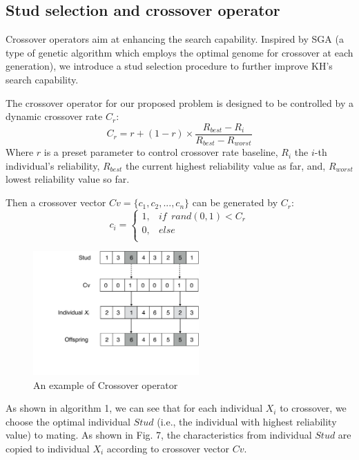 \documentclass[journal]{IEEEtran}
\begin{document}
\subsection{Stud selection and crossover operator}

Crossover operators aim at enhancing the search capability. Inspired by SGA \cite{wang2014stud} (a type of genetic algorithm which employs the optimal genome for crossover at each generation), we introduce a stud selection procedure to further improve KH's search capability.

The crossover operator for our proposed problem is designed to be controlled by a dynamic crossover rate $C_{r}$:
\begin{equation}
C_{r} = r + (1-r) \times \frac{R_{best}-R_{i}}{R_{best}-R_{worst}}
\end{equation}
Where $r$ is a preset parameter to control crossover rate baseline, $R_{i}$ the $i$-th individual's reliability, $R_{best}$ the current highest reliability value as far, and, $R_{worst}$ lowest reliability value so far.

Then a crossover vector $Cv = \{c_{1},c_{2},...,c_{n}\}$ can be generated by $C_{r}$:
\begin{equation}
c_{i}=
\begin{cases}
1,& if \ \ rand(0,1) < C_{r}\\
0,& else\\
\end{cases}
\end{equation}

\begin{figure}[!t]
\centering
\includegraphics[width=2.5in]{./img/pic5.pdf}
\caption{An example of Crossover operator}
\label{Crossover operator}
\end{figure}

As shown in algorithm 1, we can see that for each individual $X_i$ to crossover, we choose the optimal individual $Stud$ (i.e., the individual with highest reliability value) to mating. As shown in Fig. 7, the characteristics from individual $Stud$ are copied to individual $X_i$ according to crossover vector $Cv$. 
\end{document}
